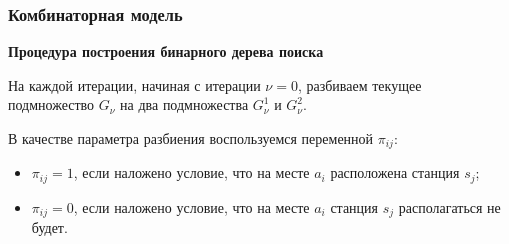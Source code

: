 \begin{frame}
    \frametitle{Комбинаторная модель}
    \justifying
    \begin{minipage}[t]{1\linewidth}
        \fontsize{8pt}{7.2}\selectfont
        \textbf{Процедура построения бинарного дерева поиска} 
        \bigskip

        На каждой итерации, начиная с итерации $\nu=0$, разбиваем текущее подмножество $G_\nu$ на два подмножества $G^1_\nu$ и $G^2_\nu$. 
    \bigskip
    \end{minipage}
    
    \begin{minipage}[b]{0.5\linewidth}
        \fontsize{8pt}{7.2}\selectfont
        В качестве параметра разбиения воспользуемся переменной $\pi_{ij}$:

        \begin{itemize}
            \item $\pi_{ij}=1$, если наложено условие, что на месте $a_i$ расположена станция $s_j$;
            \item $\pi_{ij} = 0$, если наложено условие, что на месте $a_i$ станция $s_j$  располагаться не будет.
        \end{itemize}
        \bigskip

    \end{minipage}
    \hfill
    \begin{minipage}[b]{0.47\linewidth}
        
    \end{minipage}
    \hfill



\end{frame}


